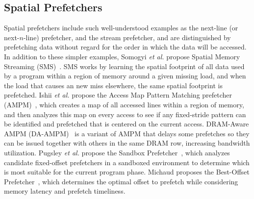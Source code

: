 
\subsection{Spatial Prefetchers}


Spatial prefetchers include such well-understood examples as the
next-line (or next-$n$-line) prefetcher, and the stream prefetcher,
and are distinguished by prefetching data without regard for the order
in which the data will be accessed.  In addition to these simpler
examples, Somogyi \textit{et al.}  propose Spatial Memory Streaming
(SMS)~\cite{SMS}.  SMS works by learning the spatial footprint of all
data used by a program within a region of memory around a given
missing load, and when the load that causes an new miss elsewhere, the
same spatial footprint is prefetched.  Ishii \textit{et al.} propose
the Access Map Pattern Matching prefetcher (AMPM)~\cite{AMPM}, which
creates a map of all accessed lines within a region of memory, and
then analyzes this map on every access to see if any fixed-stride
pattern can be identified and prefetched that is centered on the
current access. DRAM-Aware AMPM (DA-AMPM)~\cite{DA_AMPM} is a variant
of AMPM that delays some prefetches so they can be issued together
with others in the same DRAM row, increasing bandwidth utilization.
Pugsley \textit{et al.}  propose the Sandbox
Prefetcher~\cite{Sandbox}, which analyzes candidate fixed-offset
prefetchers in a sandboxed environment to determine which is most
suitable for the current program phase.  Michaud proposes the
Best-Offset Prefetcher~\cite{BOP}, which determines the optimal offset
to prefetch while considering memory latency and prefetch timeliness.

